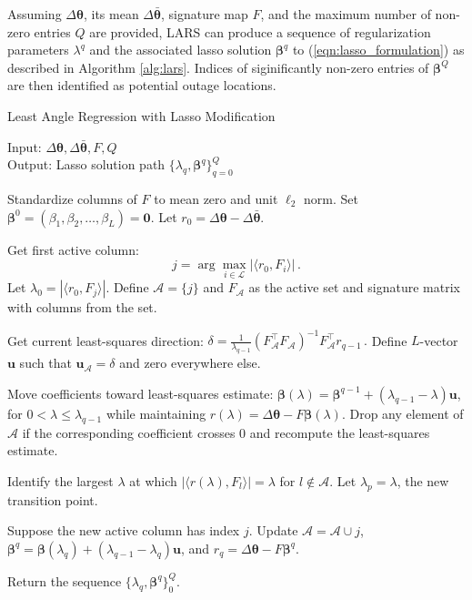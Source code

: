 Assuming $\Delta\boldsymbol{\theta}$, its mean $\Delta\bar{\boldsymbol{\theta}}$, signature map $F$, and the maximum number of non-zero entries $Q$ are provided, LARS can produce a sequence of regularization parameters $\lambda^q$ and the associated lasso solution $\boldsymbol{\beta}^q$ to (\ref{eqn:lasso_formulation}) as described in Algorithm \ref{alg:lars}. Indices of siginificantly non-zero entries of $\boldsymbol{\beta}^Q$ are then identified as potential outage locations. 
\begin{algorithm}
\caption{Least Angle Regression with Lasso Modification}
\label{alg:lars}
Input: $\Delta\boldsymbol{\theta}, \Delta\boldsymbol{\bar{\theta}}, F, Q$\\
Output: Lasso solution path $\{\lambda_q, \boldsymbol{\beta}^q\}_{q=0}^{Q}$
\begin{algorithmic}[1]
\State Standardize columns of $F$ to mean zero and unit $\ell_2$ norm. 
Set $\boldsymbol{\beta}^0 = (\beta_1, \beta_2, \dots, \beta_L) = \mathbf{0}$. Let $r_0 = \Delta\boldsymbol{\theta} - \Delta\boldsymbol{\bar{\theta}}$. 

\State Get first active column: 
$$
j = \arg\underset{i \in \mathcal{L}}\max|\langle r_0, F_i\rangle | \,.
$$
Let $\lambda_0 = |\langle r_0, F_j\rangle |$. Define $\mathcal{A} = \{j\}$ and $F_{\mathcal{A}}$ as the active set and signature matrix with columns from the set. 

\State Get current least-squares direction: 
$
\delta = \frac{1}{\lambda_{q - 1}}(F_{\mathcal{A}}^{\top}F_{\mathcal{A}})^{-1}F_{\mathcal{A}}^{\top}r_{q-1} \,.
$ 
Define $L$-vector $\mathbf{u}$ such that $\mathbf{u}_{\mathcal{A}} = \delta$ and zero everywhere else.

\State  Move coefficients toward least-squares estimate: $\boldsymbol{\beta}(\lambda) = \boldsymbol{\beta}^{q-1} + (\lambda_{q-1} - \lambda) \mathbf{u}$, for $0 < \lambda \le \lambda_{q-1}$ while maintaining $r(\lambda) = \Delta\boldsymbol{\theta} - F \boldsymbol{\beta}(\lambda)$. Drop any element of $\mathcal{A}$ if the corresponding coefficient crosses 0 and recompute the least-squares estimate. 

\State Identify the largest $\lambda$ at which $|\langle r(\lambda), F_l \rangle| = \lambda$ for $l \notin \mathcal{A}$. Let $\lambda_p = \lambda$, the new transition point.

\State Suppose the new active column has index $j$. Update $\mathcal{A} = \mathcal{A} \cup j$, $\boldsymbol{\beta}^q = \boldsymbol{\beta}(\lambda_q) + (\lambda_{q-1} - \lambda_q)\mathbf{u}$, and $r_q = \Delta\boldsymbol{\theta} - F \boldsymbol{\beta}^q$.
\EndFor

\State Return the sequence $\{\lambda_q, \boldsymbol{\beta}^q \}_0^Q$.
\end{algorithmic}
\end{algorithm}


